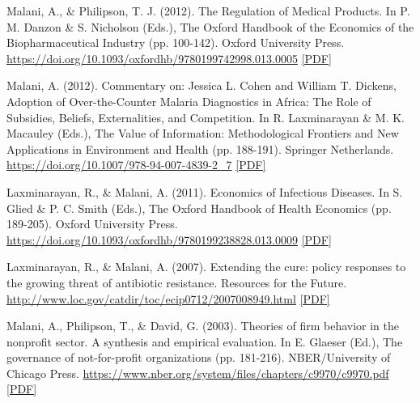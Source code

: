 \begin{tablist}
        \item[2012] \tab{}Malani, A., \& Philipson, T. J. (2012). The Regulation of Medical Products. In P. M. Danzon \& S. Nicholson (Eds.), The Oxford Handbook of the Economics of the Biopharmaceutical Industry (pp. 100-142). Oxford University Press. \href{https://doi.org/10.1093/oxfordhb/9780199742998.013.0005}{https://doi.org/10.1093/oxfordhb/9780199742998.013.0005} \href{https://github.com/anup-malani/website_personal/blob/main/publications/2012_MalaniPhilipson_Handbook_RegulationMedicalProducts.pdf}{[PDF]} 

        \item[2012] \tab{}Malani, A. (2012). Commentary on: Jessica L. Cohen and William T. Dickens, Adoption of Over-the-Counter Malaria Diagnostics in Africa: The Role of Subsidies, Beliefs, Externalities, and Competition. In R. Laxminarayan \& M. K. Macauley (Eds.), The Value of Information: Methodological Frontiers and New Applications in Environment and Health (pp. 188-191). Springer Netherlands. \href{https://doi.org/10.1007/978-94-007-4839-2_7}{https://doi.org/10.1007/978-94-007-4839-2\_7} \href{https://github.com/anup-malani/website_personal/blob/main/publications/2012_Malani_p188_CommentOnCoehnAnimalarialDiagnostics.pdf}{[PDF]} 

        \item[2011] \tab{}Laxminarayan, R., \& Malani, A. (2011). Economics of Infectious Diseases. In S. Glied \& P. C. Smith (Eds.), The Oxford Handbook of Health Economics (pp. 189-205). Oxford University Press. \href{https://doi.org/10.1093/oxfordhb/9780199238828.013.0009}{https://doi.org/10.1093/oxfordhb/9780199238828.013.0009} \href{https://github.com/anup-malani/website_personal/blob/main/publications/2011_LaxminarayanMalani_EconomicsInfectiousDiseaseHandbook.pdf}{[PDF]} 

        \item[2007] \tab{}Laxminarayan, R., \& Malani, A. (2007). Extending the cure: policy responses to the growing threat of antibiotic resistance. Resources for the Future. \href{http://www.loc.gov/catdir/toc/ecip0712/2007008949.html}{http://www.loc.gov/catdir/toc/ecip0712/2007008949.html} \href{https://github.com/anup-malani/website_personal/blob/main/publications/2007_LaxminarayanMalani_ExtendingCureBook.pdf}{[PDF]}

        \item[2003] \tab{}Malani, A., Philipson, T., \& David, G. (2003). Theories of firm behavior in the nonprofit sector. A synthesis and empirical evaluation. In E. Glaeser (Ed.), The governance of not-for-profit organizations (pp. 181-216). NBER/University of Chicago Press. \href{https://www.nber.org/system/files/chapters/c9970/c9970.pdf}{https://www.nber.org/system/files/chapters/c9970/c9970.pdf} \href{https://github.com/anup-malani/website_personal/blob/main/publications/2003_Malani_TheoryNonProfitOrgs.pdf}{[PDF]}


\end{tablist}
